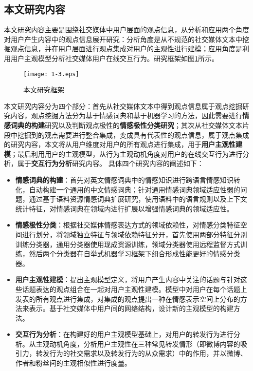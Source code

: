 \subsection{本文研究内容}
本文研究内容主要是围绕社交媒体中用户层面的观点信息，从分析和应用两个角度对用户产生内容中的观点信息展开研究：分析角度是从不规范的社交媒体文本中挖掘观点信息，并在用户层面进行观点集成对用户的主观性进行建模；应用角度是利用用户主观模型分析社交媒体用户在线交互行为。研究框架如图\ref{fig1-3}所示。

\begin{figure}[htp]
\centering
\texttt{[image: 1-3.eps]}
\caption{本文研究框架}
\label{fig1-3}
\end{figure}

本文研究内容分为四个部分：首先从社交媒体文本中得到观点信息属于观点挖掘研究内容，观点挖掘方法分为基于情感词典和基于机器学习的方法，因此需要进行\textbf{情感词典的构建}研究以及判断观点极性的\textbf{情感极性分类研究}；其次从社交媒体文本片段中挖掘到的观点需要进行整合集成，变成具有代表性的观点信息，属于观点集成的研究内容，本文将从用户维度对用户的所有观点进行集成，用于\textbf{用户主观性建模}；最后利用用户的主观模型，从行为主观动机角度对用户的在线交互行为进行分析，属于\textbf{交互行为分析}研究内容。
具体四个研究内容的阐述如下：

\begin{itemize}
\item \textbf{情感词典的构建}：首先对英文情感词典中的情感知识进行跨语言情感知识转化，自动构建一个通用的中文情感词典；针对通用情感词典领域适应性弱的问题，通过基于语料资源情感词典扩展研究，使用语料中的语言规则以及上下文统计特征，对情感词典在领域内进行扩展以增强情感词典的领域适应性。
\item \textbf{情感极性分类}：根据社交媒体情感表达方式的领域依赖性，对情感分类特征空间进行划分，将领域独立特征与领域依赖特征分开，首先使用两部分特征分别训练分类器，通用分类器使用现成资源训练，领域分类器使用远程监督方式训练，然后两个分类器在自举式机器学习框架下组合形成性能更好的情感分类器。
\item \textbf{用户主观性建模}：提出主观模型定义，将用户产生内容中关注的话题与针对这些话题表达的观点组合在一起对用户主观性建模。模型中对用户在每个话题上发表的所有观点进行集成，对集成的观点提出一种在情感表示空间上分布的方法来表示。基于社交媒体中用户间的网络结构，设计新的主观模型的构建方法。
\item \textbf{交互行为分析}：在构建好的用户主观模型基础上，对用户的转发行为进行分析。从主观动机角度，分析用户主观性在三种常见转发情形（即微博内容的吸引力，转发行为的社交需求以及转发行为的从众需求）中的作用，并以微博、作者和粉丝间的主观相似性进行度量。
\end{itemize}

